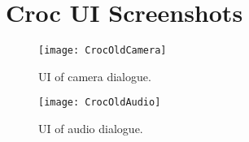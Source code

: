 \chapter{Croc UI Screenshots}\label{app:crocUI}
\begin{figure}[h]
	\centering
	\texttt{[image: CrocOldCamera]}
	\caption{UI of camera dialogue.}
\end{figure}

\begin{figure}[h]
	\centering
	\texttt{[image: CrocOldAudio]}
	\caption{UI of audio dialogue.}
\end{figure}


